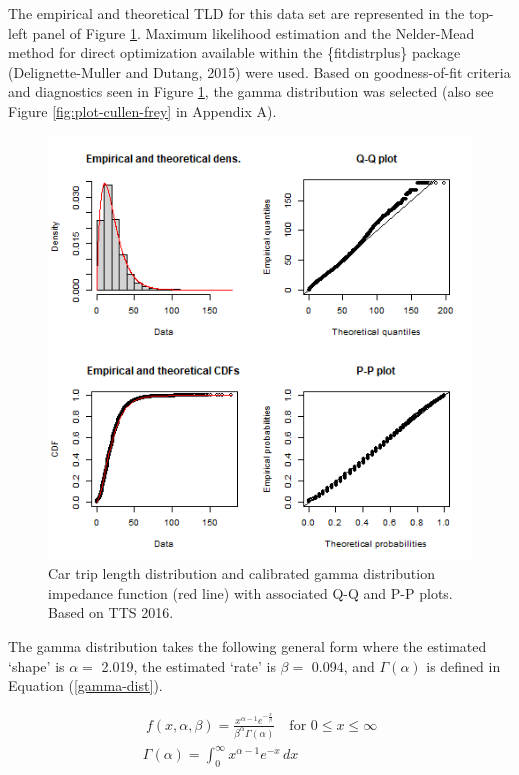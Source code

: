 \documentclass[]{elsarticle} %
\begin{document}
The empirical and theoretical TLD for this data set are represented in
the top-left panel of Figure \ref{fig:TLD-Gamma-plot}. Maximum
likelihood estimation and the Nelder-Mead method for direct optimization
available within the \{fitdistrplus\} package (Delignette-Muller and
Dutang, 2015) were used. Based on goodness-of-fit criteria and
diagnostics seen in Figure \ref{fig:TLD-Gamma-plot}, the gamma
distribution was selected (also see Figure \ref{fig:plot-cullen-frey} in
Appendix A).

\begin{figure}

{\centering \includegraphics[width=0.8\linewidth]{images/impedance_function} 

}

\caption{\label{fig:TLD-Gamma-plot}Car trip length distribution and calibrated gamma distribution impedance function (red line) with associated Q-Q and P-P plots. Based on TTS 2016.}\label{fig:TLD-Gamma-plot}
\end{figure}

The gamma distribution takes the following general form where the
estimated `shape' is \(\alpha=\) 2.019, the estimated `rate' is
\(\beta =\) 0.094, and \(\Gamma(\alpha)\) is defined in Equation
(\ref{gamma-dist}).

\begin{equation}
\label{gamma-dist}
\begin{array}{l}\ 
f(x, \alpha, \beta) = \frac {x^{\alpha-1}e^{-\frac{x}{\beta}}}{ \beta^{\alpha}\Gamma(\alpha)} \quad \text{for } 0 \leq x \leq \infty\\

\Gamma(\alpha) =  \int_{0}^{\infty} x^{\alpha-1}e^{-x} \,dx\\
\end{array}
\end{equation}
\end{document}
